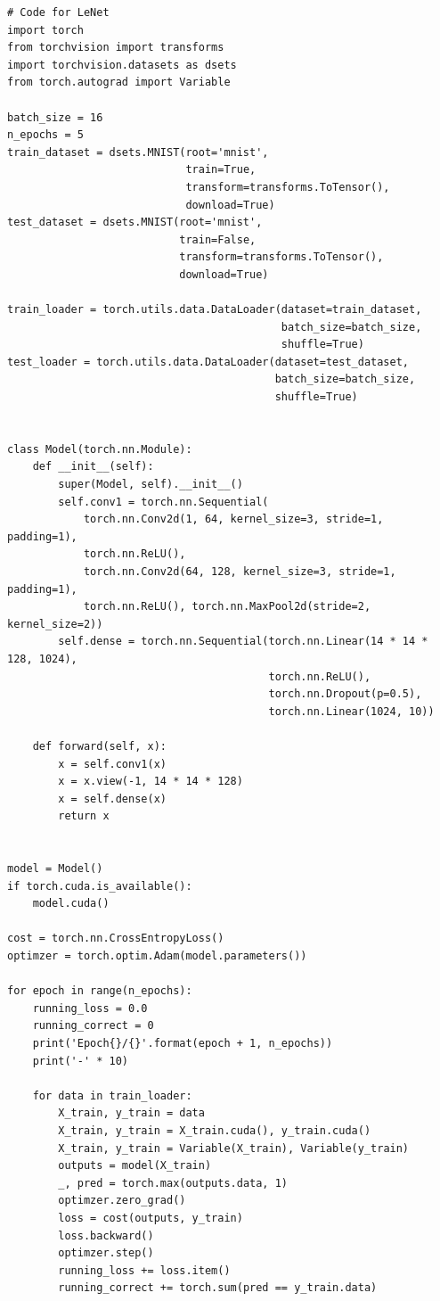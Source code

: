 \documentclass{article}
\begin{document}
\begin{lstlisting}
# Code for LeNet
import torch
from torchvision import transforms
import torchvision.datasets as dsets
from torch.autograd import Variable

batch_size = 16
n_epochs = 5
train_dataset = dsets.MNIST(root='mnist',
                            train=True,
                            transform=transforms.ToTensor(),
                            download=True)
test_dataset = dsets.MNIST(root='mnist',
                           train=False,
                           transform=transforms.ToTensor(),
                           download=True)

train_loader = torch.utils.data.DataLoader(dataset=train_dataset,
                                           batch_size=batch_size,
                                           shuffle=True)
test_loader = torch.utils.data.DataLoader(dataset=test_dataset,
                                          batch_size=batch_size,
                                          shuffle=True)


class Model(torch.nn.Module):
    def __init__(self):
        super(Model, self).__init__()
        self.conv1 = torch.nn.Sequential(
            torch.nn.Conv2d(1, 64, kernel_size=3, stride=1, padding=1),
            torch.nn.ReLU(),
            torch.nn.Conv2d(64, 128, kernel_size=3, stride=1, padding=1),
            torch.nn.ReLU(), torch.nn.MaxPool2d(stride=2, kernel_size=2))
        self.dense = torch.nn.Sequential(torch.nn.Linear(14 * 14 * 128, 1024),
                                         torch.nn.ReLU(),
                                         torch.nn.Dropout(p=0.5),
                                         torch.nn.Linear(1024, 10))

    def forward(self, x):
        x = self.conv1(x)
        x = x.view(-1, 14 * 14 * 128)
        x = self.dense(x)
        return x


model = Model()
if torch.cuda.is_available():
    model.cuda()

cost = torch.nn.CrossEntropyLoss()
optimzer = torch.optim.Adam(model.parameters())

for epoch in range(n_epochs):
    running_loss = 0.0
    running_correct = 0
    print('Epoch{}/{}'.format(epoch + 1, n_epochs))
    print('-' * 10)

    for data in train_loader:
        X_train, y_train = data
        X_train, y_train = X_train.cuda(), y_train.cuda()
        X_train, y_train = Variable(X_train), Variable(y_train)
        outputs = model(X_train)
        _, pred = torch.max(outputs.data, 1)
        optimzer.zero_grad()
        loss = cost(outputs, y_train)
        loss.backward()
        optimzer.step()
        running_loss += loss.item()
        running_correct += torch.sum(pred == y_train.data)


\end{lstlisting}
\end{document}
